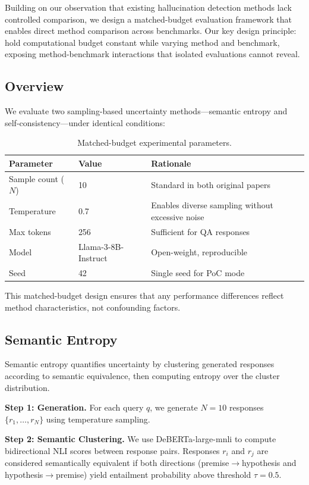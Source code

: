 Building on our observation that existing hallucination detection methods lack controlled comparison, we design a matched-budget evaluation framework that enables direct method comparison across benchmarks. Our key design principle: hold computational budget constant while varying method and benchmark, exposing method-benchmark interactions that isolated evaluations cannot reveal.

\subsection{Overview}

We evaluate two sampling-based uncertainty methods---semantic entropy and self-consistency---under identical conditions:

\begin{table}[h]
\centering
\begin{tabular}{@{}lll@{}}
\toprule
\textbf{Parameter} & \textbf{Value} & \textbf{Rationale} \\
\midrule
Sample count ($N$) & 10 & Standard in both original papers \\
Temperature & 0.7 & Enables diverse sampling without excessive noise \\
Max tokens & 256 & Sufficient for QA responses \\
Model & Llama-3-8B-Instruct & Open-weight, reproducible \\
Seed & 42 & Single seed for PoC mode \\
\bottomrule
\end{tabular}
\caption{Matched-budget experimental parameters.}
\label{tab:params}
\end{table}

This matched-budget design ensures that any performance differences reflect method characteristics, not confounding factors.

\subsection{Semantic Entropy}

Semantic entropy quantifies uncertainty by clustering generated responses according to semantic equivalence, then computing entropy over the cluster distribution.

\textbf{Step 1: Generation.} For each query $q$, we generate $N=10$ responses $\{r_1, \ldots, r_N\}$ using temperature sampling.

\textbf{Step 2: Semantic Clustering.} We use DeBERTa-large-mnli \citep{he2021deberta} to compute bidirectional NLI scores between response pairs. Responses $r_i$ and $r_j$ are considered semantically equivalent if both directions (premise$\rightarrow$hypothesis and hypothesis$\rightarrow$premise) yield entailment probability above threshold $\tau=0.5$.


